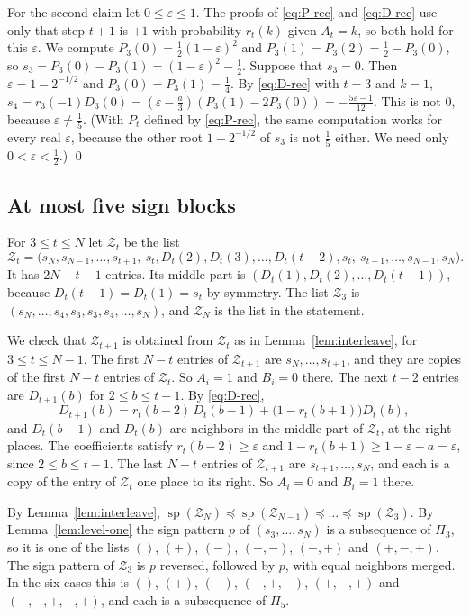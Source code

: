 For the second claim let $0\le\varepsilon\le1$. The proofs of \eqref{eq:P-rec}
and \eqref{eq:D-rec} use only that step $t+1$ is $+1$ with probability $r_t(k)$
given $A_t=k$, so both hold for this $\varepsilon$. We compute
$P_3(0)=\frac12(1-\varepsilon)^2$ and
$P_3(1)=P_3(2)=\frac12-P_3(0)$, so $s_3=P_3(0)-P_3(1)=(1-\varepsilon)^2-\frac12$.
Suppose that $s_3=0$. Then $\varepsilon=1-2^{-1/2}$ and $P_3(0)=P_3(1)=\frac14$.
By \eqref{eq:D-rec} with $t=3$ and $k=1$,
$s_4=r_3(-1)D_3(0)=(\varepsilon-\frac a3)(P_3(1)-2P_3(0))=-\frac{5\varepsilon-1}{12}$.
This is not $0$, because $\varepsilon\ne\frac15$. (With $P_t$ defined by
\eqref{eq:P-rec}, the same computation works for every real $\varepsilon$, because the other
root $1+2^{-1/2}$ of $s_3$ is not $\frac15$ either. We need only $0<\varepsilon<\frac12$.) \qed

\subsection{At most five sign blocks}\label{app:signs-five}

For $3\le t\le N$ let $\mathcal Z_t$ be the list
\[
 \mathcal Z_t=\bigl(s_N,s_{N-1},\dots,s_{t+1},\ s_t,D_t(2),D_t(3),\dots,D_t(t-2),s_t,\
 s_{t+1},\dots,s_{N-1},s_N\bigr).
\]
It has $2N-t-1$ entries. Its middle part is
$(D_t(1),D_t(2),\dots,D_t(t-1))$, because $D_t(t-1)=D_t(1)=s_t$ by symmetry.
The list $\mathcal Z_3$ is $(s_N,\dots,s_4,s_3,s_3,s_4,\dots,s_N)$, and $\mathcal Z_N$ is the
list in the statement.

We check that $\mathcal Z_{t+1}$ is obtained from $\mathcal Z_t$ as in
Lemma~\ref{lem:interleave}, for $3\le t\le N-1$. The first $N-t$ entries of
$\mathcal Z_{t+1}$ are $s_N,\dots,s_{t+1}$, and they are copies of the first $N-t$
entries of $\mathcal Z_t$. So $A_i=1$ and $B_i=0$ there. The next $t-2$ entries are
$D_{t+1}(b)$ for $2\le b\le t-1$. By \eqref{eq:D-rec},
\[
 D_{t+1}(b)=r_t(b-2)\,D_t(b-1)+\bigl(1-r_t(b+1)\bigr)D_t(b),
\]
and $D_t(b-1)$ and $D_t(b)$ are neighbors in the middle part of $\mathcal Z_t$, at the
right places. The coefficients satisfy $r_t(b-2)\ge\varepsilon$ and
$1-r_t(b+1)\ge1-\varepsilon-a=\varepsilon$, since $2\le b\le t-1$. The last
$N-t$ entries of $\mathcal Z_{t+1}$ are $s_{t+1},\dots,s_N$, and each is a copy of the
entry of $\mathcal Z_t$ one place to its right. So $A_i=0$ and $B_i=1$ there.

By Lemma~\ref{lem:interleave},
$\operatorname{sp}(\mathcal Z_N)\preceq\operatorname{sp}(\mathcal Z_{N-1})\preceq\dots\preceq\operatorname{sp}(\mathcal Z_3)$.
By Lemma~\ref{lem:level-one} the sign pattern $p$ of $(s_3,\dots,s_N)$ is a
subsequence of $\Pi_3$, so it is one of the lists $()$, $(+)$, $(-)$, $(+,-)$,
$(-,+)$ and $(+,-,+)$. The sign pattern of $\mathcal Z_3$ is $p$ reversed, followed by
$p$, with equal neighbors merged. In the six cases this is $()$, $(+)$, $(-)$,
$(-,+,-)$, $(+,-,+)$ and $(+,-,+,-,+)$, and each is a subsequence of $\Pi_5$.

